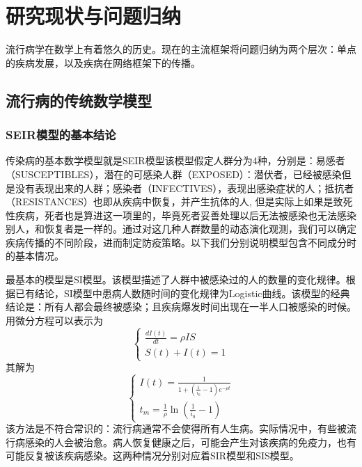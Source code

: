 \chapter{研究现状与问题归纳}

流行病学在数学上有着悠久的历史。现在的主流框架将问题归纳为两个层次：单点的疾病发展，以及疾病在网络框架下的传播。

\section{流行病的传统数学模型}

\subsection{SEIR模型的基本结论}

传染病的基本数学模型就是SEIR模型该模型假定人群分为4种，分别是：易感者（SUSCEPTIBLES），潜在的可感染人群（EXPOSED）：潜伏者，已经被感染但是没有表现出来的人群；感染者（INFECTIVES），表现出感染症状的人；抵抗者（RESISTANCES）也即从疾病中恢复，并产生抗体的人, 但是实际上如果是致死性疾病，死者也是算进这一项里的，毕竟死者妥善处理以后无法被感染也无法感染别人，和恢复者是一样的。通过对这几种人群数量的动态演化观测，我们可以确定疾病传播的不同阶段，进而制定防疫策略。以下我们分别说明模型包含不同成分时的基本情况。

最基本的模型是SI模型。该模型描述了人群中被感染过的人的数量的变化规律。根据已有结论，SI模型中患病人数随时间的变化规律为Logistic曲线。该模型的经典结论是：所有人都会最终被感染；且疾病爆发时间出现在一半人口被感染的时候。用微分方程可以表示为
\begin{equation}
    \left\{\begin{array}{l}
    {\frac{d I(t)}{d t}=\rho I S} \\
    {S(t)+I(t)=1}
    \end{array}\right.
\end{equation}
其解为
\begin{equation}
    \left\{\begin{array}{l}
    {I(t)=\frac{1}{1+\left(\frac{1}{i_{0}}-1\right) e^{-\rho t}}} \\
    {t_{m}=\frac{1}{\rho} \ln \left(\frac{1}{i_{0}}-1\right)}
    \end{array}\right.
\end{equation}
该方法是不符合常识的：流行病通常不会使得所有人生病。实际情况中，有些被流行病感染的人会被治愈。病人恢复健康之后，可能会产生对该疾病的免疫力，也有可能反复被该疾病感染。这两种情况分别对应着SIR模型和SIS模型。

